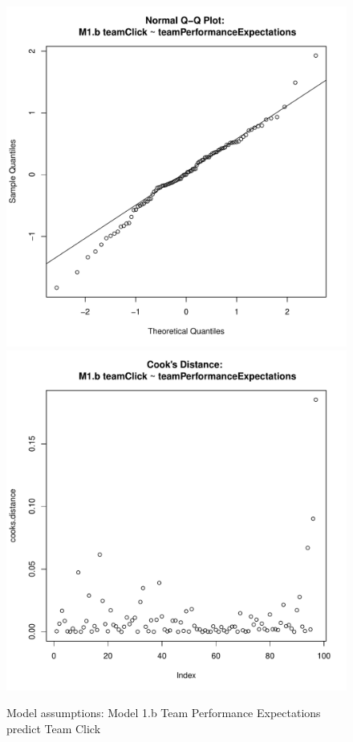 \begin{figure}[htbp]
   \includegraphics[scale =.4]{images/MLM1bQQNorm.pdf}
   \includegraphics[scale =.4]{images/MLM1bCooksD.pdf}
   \caption{Model assumptions: Model 1.b Team Performance Expectations predict Team Click}
   \label{fig:MLM1bAssumptions}
 \end{figure}



